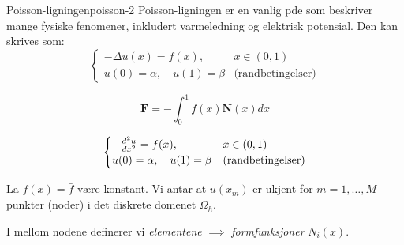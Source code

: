 \documentclass[../main.tex]{subfiles}
\begin{document}
\begin{example}{Poisson-ligningen}{poisson-2}
    Poisson-ligningen er en vanlig pde som beskriver mange fysiske fenomener, inkludert varmeledning og elektrisk potensial.
    Den kan skrives som:
    \begin{equation}
        \begin{cases}
            -\Delta u(x) = f(x),              & x \in (0,1)              \\
            u(0) = \alpha, \quad u(1) = \beta & \text{(randbetingelser)}
        \end{cases}
    \end{equation}

    \begin{equation}
        \mathbf{F} = - \int_0^1 f( x) \mathbf{N}(x) dx
    \end{equation}

    \begin{equation}
        \begin{cases}
            -\ddn[u]{2}{x} = f(x),            & x \in (0,1)              \\
            u(0) = \alpha, \quad u(1) = \beta & \text{(randbetingelser)}
        \end{cases}
    \end{equation}

\end{example}

La \(f(x) = \bar{f}\) være konstant. Vi antar at \(u(x_m)\) er ukjent for \(m = 1, \ldots, M\) punkter (noder) i det diskrete domenet \(\Omega_h\).

I mellom nodene definerer vi \textit{elementene} \(\implies\) \textit{formfunksjoner} \(N_i(x)\).
\end{document}
